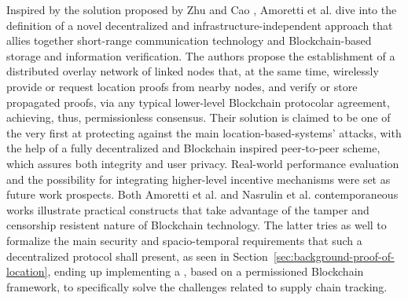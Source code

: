 Inspired by the solution proposed by Zhu and Cao \cite{zhu2011applaus}, Amoretti et al. \cite{amoretti2018blockchain} dive into the definition of a novel decentralized and infrastructure-independent approach that allies together short-range communication technology and Blockchain-based storage and information verification. The authors propose the establishment of a distributed overlay network of linked nodes that, at the same time, wirelessly provide or request location proofs from nearby nodes, and verify or store propagated proofs, via any typical lower-level Blockchain protocolar agreement, achieving, thus, permissionless consensus. Their solution is claimed to be one of the very first at protecting against the main location-based-systems' attacks, with the help of a fully decentralized and Blockchain inspired peer-to-peer scheme, which assures both integrity and user privacy. Real-world performance evaluation and the possibility for integrating higher-level incentive mechanisms were set as future work prospects. Both Amoretti et al. \cite{amoretti2018blockchain} and Nasrulin et al. \cite{nasrulin2018robust} contemporaneous works illustrate practical constructs that take advantage of the tamper and censorship resistent nature of Blockchain technology. The latter tries as well to formalize the main security and spacio-temporal requirements that such a decentralized \pol{} protocol shall present, as seen in Section~\ref{sec:background-proof-of-location}, ending up implementing a \poc{}, based on a permissioned Blockchain framework, to specifically solve the challenges related to supply chain tracking.

